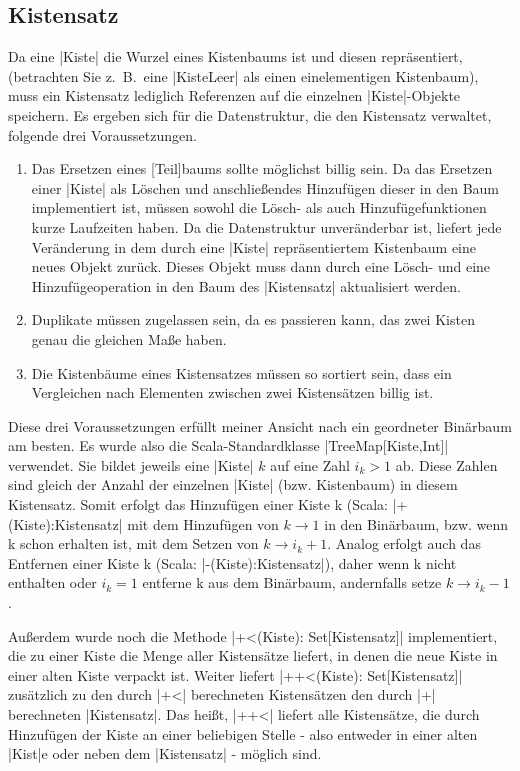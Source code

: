 \subsection{Kistensatz}
 Da eine |Kiste| die Wurzel eines Kistenbaums ist und diesen repräsentiert, (betrachten Sie z.\ B.\ eine |KisteLeer| als einen einelementigen Kistenbaum),
  muss ein Kistensatz lediglich Referenzen auf die einzelnen |Kiste|-Objekte speichern.
 Es ergeben sich für die Datenstruktur, die den Kistensatz verwaltet, folgende drei Voraussetzungen. 
\begin{enumerate}
 \item Das Ersetzen eines [Teil]baums sollte möglichst billig sein.
  Da das Ersetzen einer |Kiste| als Löschen und anschließendes Hinzufügen dieser in den Baum implementiert ist,
   müssen sowohl die Lösch- als auch Hinzufügefunktionen kurze Laufzeiten haben.
  Da die Datenstruktur unveränderbar ist, liefert jede Veränderung in dem durch eine |Kiste| repräsentiertem Kistenbaum eine neues Objekt zurück.
  Dieses Objekt muss dann durch eine Lösch- und eine Hinzufügeoperation in den Baum des |Kistensatz| aktualisiert werden.
 \item Duplikate müssen zugelassen sein, da es passieren kann, das zwei Kisten genau die gleichen Maße haben.
 \item Die Kistenbäume eines Kistensatzes müssen so sortiert sein, dass ein Vergleichen nach Elementen zwischen zwei Kistensätzen billig ist.
\end{enumerate}
Diese drei Voraussetzungen erfüllt meiner Ansicht nach ein geordneter Binärbaum am besten.
Es wurde also die Scala-Standardklasse |TreeMap[Kiste,Int]| verwendet. Sie bildet jeweils eine |Kiste| $k$ auf eine Zahl $i_k > 1$ ab.
Diese Zahlen sind gleich der Anzahl der einzelnen |Kiste| (bzw. Kistenbaum) in diesem Kistensatz.
Somit erfolgt das Hinzufügen einer Kiste k (Scala: |+(Kiste):Kistensatz| mit dem Hinzufügen von $k \rightarrow 1$ in den Binärbaum,
  bzw. wenn k schon erhalten ist, mit dem Setzen von $k \rightarrow i_k + 1$.
Analog erfolgt auch das Entfernen einer Kiste k (Scala: |-(Kiste):Kistensatz|),
  daher wenn k nicht enthalten oder $i_k = 1$ entferne k aus dem Binärbaum, andernfalls setze $k \rightarrow i_k - 1$.

Außerdem wurde noch die Methode |+<(Kiste): Set[Kistensatz]| implementiert, die zu einer Kiste die Menge aller Kistensätze liefert,
in denen die neue Kiste in einer alten Kiste verpackt ist.
Weiter liefert |++<(Kiste): Set[Kistensatz]| zusätzlich zu den durch |+<| berechneten Kistensätzen den durch |+| berechneten |Kistensatz|.
Das heißt, |++<| liefert alle Kistensätze, die durch Hinzufügen der Kiste an einer beliebigen Stelle
 - also entweder in einer alten |Kist|e oder neben dem |Kistensatz| - möglich sind.
